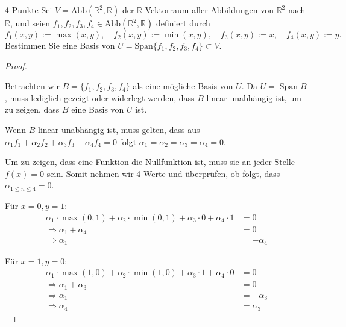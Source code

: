 \documentclass{problemset}
\begin{document}
\begin{problem}{4 Punkte}
Sei $V = \text{Abb}(\mathbb{R}^2, \mathbb{R})$ der $\mathbb{R}$-Vektorraum aller Abbildungen von $\mathbb{R}^2$ nach $\mathbb{R}$, und seien $f_1, f_2, f_3, f_4 \in \text{Abb}(\mathbb{R}^2, \mathbb{R})$ definiert durch
\[ f_1(x, y) := \max(x, y), \quad f_2(x, y) := \min(x, y), \quad f_3(x, y) := x, \quad f_4(x, y) := y. \]
Bestimmen Sie eine Basis von $U = \text{Span}\{f_1, f_2, f_3, f_4\} \subset
   V$.
\begin{proof}
    $ $

    Betrachten wir $B = \{f_1, f_2, f_3, f_4\}$ als eine mögliche Basis von
    $U$. Da $U = \operatorname{Span} B$, muss lediglich gezeigt oder widerlegt
    werden, dass $B$ linear unabhängig ist, um zu zeigen, dass $B$ eine Basis
    von $U$ ist.

    Wenn $B$ linear unabhängig ist, muss gelten, dass aus $\alpha_1 f_1 +
    \alpha_2 f_2 + \alpha_3 f_3 + \alpha_4 f_4 = 0$ folgt $\alpha_1 = \alpha_2
    = \alpha_3 = \alpha_4 = 0$.

    Um zu zeigen, dass eine Funktion die Nullfunktion ist, muss sie an jeder
    Stelle $f(x) = 0$ sein. Somit nehmen wir 4 Werte und überprüfen, ob folgt,
    dass $\alpha_{1 \le n \le 4} = 0$.

    Für $x = 0, y = 1$:
    \begin{align*}
        \alpha_1 \cdot \max(0, 1) + \alpha_2 \cdot \min(0, 1) + \alpha_3 \cdot 0 + \alpha_4 \cdot 1 & = 0         \\
        \Rightarrow \alpha_1 + \alpha_4                                                             & = 0         \\
        \Rightarrow \alpha_1                                                                        & = -\alpha_4
    \end{align*}

    Für $x = 1, y = 0$:
    \begin{align*}
        \alpha_1 \cdot \max(1, 0) + \alpha_2 \cdot \min(1, 0) + \alpha_3 \cdot 1 + \alpha_4 \cdot 0 & = 0         \\
        \Rightarrow \alpha_1 + \alpha_3                                                             & = 0         \\
        \Rightarrow \alpha_1                                                                        & = -\alpha_3 \\
        \Rightarrow \alpha_4                                                                        & = \alpha_3
    \end{align*}


\end{proof}
\end{problem}
\end{document}
